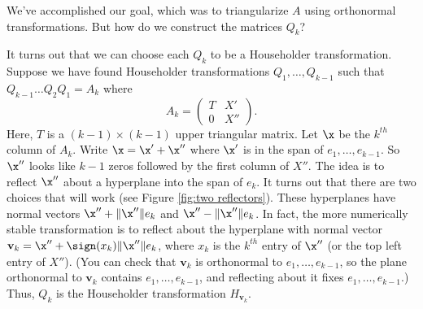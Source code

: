 We've accomplished our goal, which was to triangularize $A$ using orthonormal transformations.
But how do we construct the matrices $Q_k$?

It turns out that we can choose each $Q_k$ to be a Householder transformation.
Suppose we have found Householder transformations $Q_1, \ldots, Q_{k-1}$ such that $Q_{k-1}\ldots Q_2Q_1 = A_k$ where
\[
A_k = \begin{pmatrix}
T & X' \\
0 & X''
\end{pmatrix}.
\]
Here, $T$ is a $(k-1) \times (k-1)$ upper triangular matrix.
Let $\x$ be the $k^{th}$ column of $A_k$.
Write $\x = \x' + \x''$ where $\x'$ is in the span of $e_1, \ldots, e_{k-1}$.
So $\x''$ looks like $k-1$ zeros followed by the first column of $X''$.
The idea is to reflect $\x''$ about a hyperplane into the span of $e_k$.
It turns out that there are two choices that will work (see Figure \ref{fig:two reflectors}).
These hyperplanes have normal vectors $\x'' + \| \x'' \|e_k$ and $\x'' - \| \x'' \|e_k$.
In fact, the more numerically stable transformation is to reflect about the hyperplane with normal vector $\mathbf{v}_k = \x'' +\sign(x_k) \| \x'' \|e_k$, where $x_k$ is the $k^{th}$ entry of $\x''$ (or the top left entry of $X''$).
(You can check that $\mathbf{v}_k$ is orthonormal to $e_1, \ldots, e_{k-1}$, so the plane orthonormal to $\mathbf{v}_k$ contains $e_1, \ldots, e_{k-1}$, and reflecting about it fixes $e_1, \ldots, e_{k-1}$.)
Thus, $Q_k$ is the Householder transformation $H_{\mathbf{v}_k}$.

